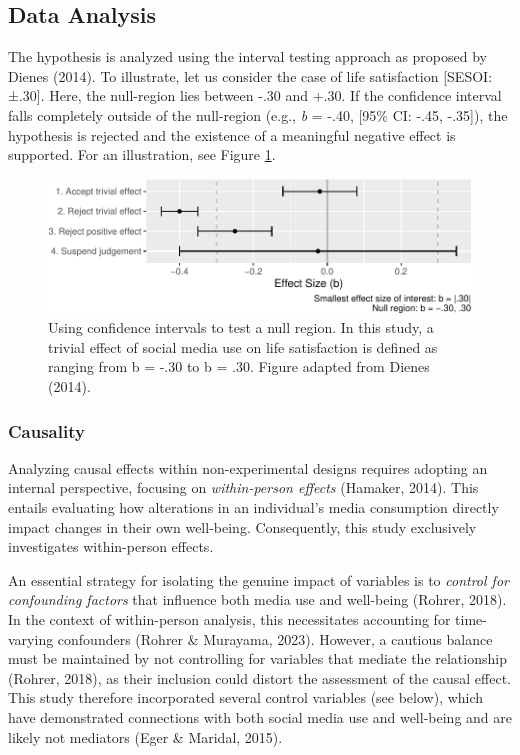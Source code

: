 \documentclass[
  man,mask,floatsintext]{apa7}
\begin{document}
\subsection{Data Analysis}\label{data-analysis}

The hypothesis is analyzed using the interval testing approach as proposed by Dienes (2014).
To illustrate, let us consider the case of life satisfaction {[}SESOI: ±.30{]}.
Here, the null-region lies between -.30 and +.30.
If the confidence interval falls completely outside of the null-region (e.g., \emph{b} = -.40, {[}95\% CI: -.45, -.35{]}), the hypothesis is rejected and the existence of a meaningful negative effect is supported.
For an illustration, see Figure \ref{fig:sesoi}.

\begin{figure}
\centering
\includegraphics{manuscript_files/figure-latex/sesoi-1.pdf}
\caption{\label{fig:sesoi}Using confidence intervals to test a null region. In this study, a trivial effect of social media use on life satisfaction is defined as ranging from b = -.30 to b = .30. Figure adapted from Dienes (2014).}
\end{figure}

\subsubsection{Causality}\label{causality}

Analyzing causal effects within non-experimental designs requires adopting an internal perspective, focusing on \emph{within-person effects} (Hamaker, 2014).
This entails evaluating how alterations in an individual's media consumption directly impact changes in their own well-being.
Consequently, this study exclusively investigates within-person effects.

An essential strategy for isolating the genuine impact of variables is to \emph{control for confounding factors} that influence both media use and well-being (Rohrer, 2018).
In the context of within-person analysis, this necessitates accounting for time-varying confounders (Rohrer \& Murayama, 2023).
However, a cautious balance must be maintained by not controlling for variables that mediate the relationship (Rohrer, 2018), as their inclusion could distort the assessment of the causal effect.
This study therefore incorporated several control variables (see below), which have demonstrated connections with both social media use and well-being and are likely not mediators (Eger \& Maridal, 2015).
\end{document}

